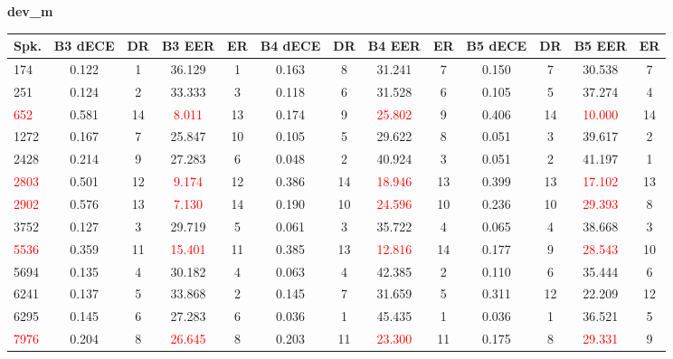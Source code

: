 \documentclass[12pt,leqno,a4paper]{article}
\begin{document}
\begin{table}[H]
\centering
\textbf{dev\_m}\\[2pt]
\scriptsize
\setlength{\tabcolsep}{3pt}
\begin{tabular}{lcccccccccccc}
\toprule
\textbf{Spk.}
& \textbf{B3 dECE} & \textbf{DR} & \textbf{B3 EER} & \textbf{ER}
& \textbf{B4 dECE} & \textbf{DR} & \textbf{B4 EER} & \textbf{ER}
& \textbf{B5 dECE} & \textbf{DR} & \textbf{B5 EER} & \textbf{ER} \\
\midrule
174  & 0.122 & 1  & 36.129 & 1  & 0.163 & 8  & 31.241 & 7  
     & 0.150 & 7  & 30.538 & 7  \\
251  & 0.124 & 2  & 33.333 & 3  & 0.118 & 6  & 31.528 & 6  
     & 0.105 & 5  & 37.274 & 4  \\
\textcolor{red}{652}  
     & 0.581 & 14 & \textcolor{red}{8.011}  & 13 
     & 0.174 & 9  & \textcolor{red}{25.802} & 9  
     & 0.406 & 14 & \textcolor{red}{10.000} & 14 \\
1272 & 0.167 & 7  & 25.847 & 10 & 0.105 & 5  & 29.622 & 8  
     & 0.051 & 3  & 39.617 & 2  \\
2428 & 0.214 & 9  & 27.283 & 6  & 0.048 & 2  & 40.924 & 3  
     & 0.051 & 2  & 41.197 & 1  \\
\textcolor{red}{2803} 
     & 0.501 & 12 & \textcolor{red}{9.174}  & 12 
     & 0.386 & 14 & \textcolor{red}{18.946} & 13 
     & 0.399 & 13 & \textcolor{red}{17.102} & 13 \\
\textcolor{red}{2902} 
     & 0.576 & 13 & \textcolor{red}{7.130}  & 14 
     & 0.190 & 10 & \textcolor{red}{24.596} & 10 
     & 0.236 & 10 & \textcolor{red}{29.393} & 8  \\
3752 & 0.127 & 3  & 29.719 & 5  & 0.061 & 3  & 35.722 & 4  
     & 0.065 & 4  & 38.668 & 3  \\
\textcolor{red}{5536} 
     & 0.359 & 11 & \textcolor{red}{15.401} & 11 
     & 0.385 & 13 & \textcolor{red}{12.816} & 14 
     & 0.177 & 9  & \textcolor{red}{28.543} & 10 \\
5694 & 0.135 & 4  & 30.182 & 4  & 0.063 & 4  & 42.385 & 2  
     & 0.110 & 6  & 35.444 & 6  \\
6241 & 0.137 & 5  & 33.868 & 2  & 0.145 & 7  & 31.659 & 5  
     & 0.311 & 12 & 22.209 & 12 \\
6295 & 0.145 & 6  & 27.283 & 6  & 0.036 & 1  & 45.435 & 1  
     & 0.036 & 1  & 36.521 & 5  \\
\textcolor{red}{7976} 
     & 0.204 & 8  & \textcolor{red}{26.645} & 8  
     & 0.203 & 11 & \textcolor{red}{23.300} & 11 
     & 0.175 & 8  & \textcolor{red}{29.331} & 9  \\

\end{tabular}
\end{table}
\end{document}
